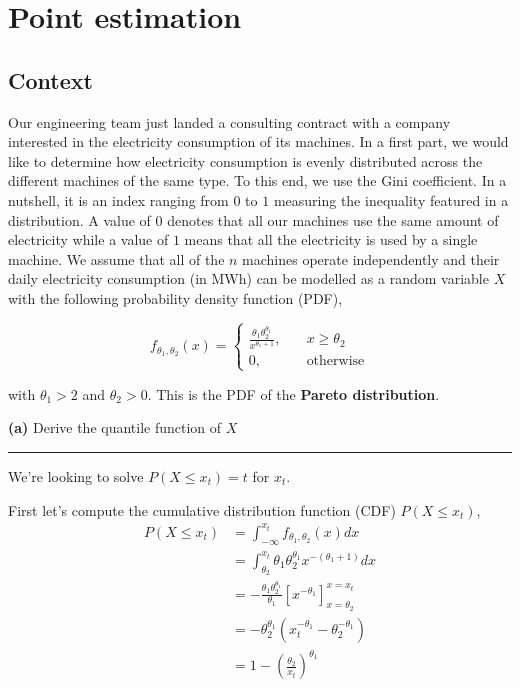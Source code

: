 \section{Point estimation}

\subsection*{Context}
Our engineering team just landed a consulting contract with a company interested in the electricity consumption of its machines. In a first part, we would like to determine how electricity consumption is evenly distributed across the different machines of the same type. To this end, we use the Gini coefficient. In a nutshell, it is an index ranging from $0$ to $1$ measuring the inequality featured in a distribution. A value of $0$ denotes that all our machines use the same amount of electricity while a value of $1$ means that all the electricity is used by a single machine.
We assume that all of the $n$ machines operate independently and their daily electricity consumption (in MWh) can be modelled as a random variable $X$ with the following probability density function (PDF),

\begin{equation}
  f_{\theta_1, \theta_2}(x) = 
  \begin{cases}
    \frac{\theta_1 \theta_2^{\theta_1}}{x^{\theta_1 + 1}}, &\quad x \geq \theta_2 \\
    0,                                                     &\quad \text{otherwise}
  \end{cases}
\end{equation}

with $\theta_1 > 2$ and $\theta_2 > 0$. This is the PDF of the \textbf{Pareto distribution}.

\textbf{(a)} Derive the quantile function of $X$

\begin{center}\rule{6cm}{0.4pt}\end{center}

We're looking to solve $P(X \leq x_t) = t$ for $x_t$.

First let's compute the cumulative distribution function (CDF) $P(X \leq x_t)$, 
\begin{align*}
  P(X \leq x_t)
    &= \int_{-\infty}^{x_t} f_{\theta_1, \theta_2}(x) dx \\
    &= \int_{\theta_2}^{x_t} \theta_1 \theta_2^{\theta_1} x^{-(\theta_1 + 1)} dx \\
    &= - \frac{\theta_1 \theta_2^{\theta_1}}{\theta_1} \left[ x^{-\theta_1} \right]_{x=\theta_2}^{x=x_t} \\
    &= - \theta_2^{\theta_1} \left( x_t^{-\theta_1} - \theta_2^{-\theta_1} \right) \\
    &= 1 - \left( \frac{\theta_2}{x_t} \right)^{\theta_1}
\end{align*}

